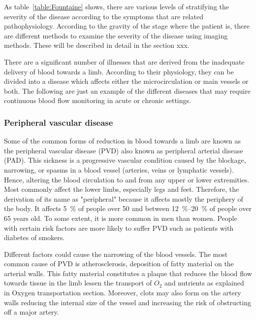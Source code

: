 As table~\ref{table:Fountaine} shows, there are various levels of stratifying the severity of the disease according to the symptoms that are related pathophysiology. According to the gravity of the stage where the patient is, there are different methods to examine the severity of the disease using imaging methods. These will be described in detail in the section xxx.


There are a significant number of illnesses that are derived from the inadequate delivery of blood towards a limb. According to their physiology, they can be divided into a disease which affects either the microcirculation or main vessels or both. The following are just an example of the different diseases that may require continuous blood flow monitoring in acute or chronic settings.



\subsubsection{Peripheral vascular disease}
\label{section literature 2.1}
Some of the common forms of reduction in blood towards a limb are known as the peripheral vascular disease (PVD) also known as peripheral arterial disease (PAD). This sickness is a progressive vascular condition caused by the blockage, narrowing, or spasms in a blood vessel (arteries, veins or lymphatic vessels). Hence, altering the blood circulation to and from any upper or lower extremities.  Most commonly affect the lower limbs, especially legs and feet. Therefore, the derivation of its name as "peripheral" because it affects mostly the periphery of the body. It affects \SI{5}{\percent} of people over \num{50} and between \SIrange{12}{20}{\percent} of people over 65 years old. To some extent, it is more common in men than women. People with certain risk factors are more likely to suffer PVD such as patients with diabetes of smokers.  


Different factors could cause the narrowing of the blood vessels. The most common cause of PVD is atherosclerosis, deposition of fatty material on the arterial walls. This fatty material constitutes a plaque that reduces the blood flow towards tissue in the limb lessen the transport of $O_2$ and nutrients as explained in Oxygen transportation section. Moreover, clots may also form on the artery walls reducing the internal size of the vessel and increasing the risk of obstructing off a major artery. 

